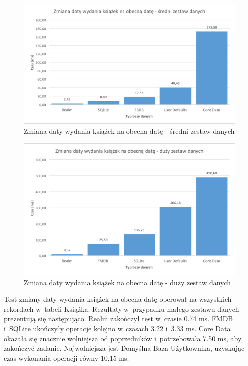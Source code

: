 \begin{figure}[H]
    \centering\includegraphics[width=\linewidth]{img/update_data/update_book/update_book_medium_test.png}
    \caption{Zmiana daty wydania książek na obecna datę - średni zestaw danych}
    \label{img: update-by-book-medium}
\end{figure}

\begin{figure}[H]
    \centering\includegraphics[width=\linewidth]{img/update_data/update_book/update_book_big_test.png}
    \caption{Zmiana daty wydania książek na obecna datę - duży zestaw danych}
    \label{img: update-by-book-big}
\end{figure}

Test zmiany daty wydania książek na obecna datę operował na wszystkich rekordach w~tabeli Książka. Rezultaty w~przypadku małego zestawu danych prezentują się następująco. Realm zakończył test w~czasie 0.74 ms. FMDB i~SQLite ukończyły operacje kolejno w~czasach 3.22 i~3.33 ms. Core Data okazała się znacznie wolniejsza od poprzedników i~potrzebowała 7.50 ms, aby zakończyć zadanie. Najwolniejsza jest Domyślna Baza Użytkownika, uzyskując czas wykonania operacji równy 10.15 ms. 

